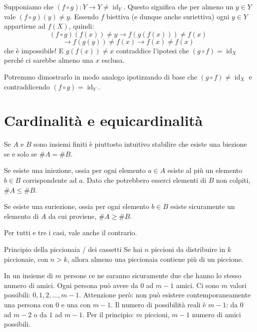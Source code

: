 \documentclass[12pt]{report}
\begin{document}
	\begin{dimostrazione}{}{}
		Supponiamo che $(f \circ g): Y \to Y \neq \operatorname{id}_Y$. Questo significa che per almeno un $y \in Y$ vale $(f \circ g)(y) \neq y$.
		Essendo $f$ biettiva (e dunque anche suriettiva) ogni $y \in Y$ appartiene ad $f(X)$, quindi:
		\[
		(f \circ g)(f(x)) \neq y \longrightarrow f(g(f(x))) \neq f(x)
		\]
		\[
		\longrightarrow f(g(y)) \neq f(x) \longrightarrow f(x) \neq f(x)
		\]
		che è impossibile! E $g(f(x)) \neq x$ contraddice l'ipotesi che $(g \circ f) = \operatorname{id}_X$ perché ci sarebbe almeno una $x$ esclusa.
		
		Potremmo dimostrarlo in modo analogo ipotizzando di base che $(g \circ f) \neq \operatorname{id}_X$ e contraddicendo $(f \circ g) = \operatorname{id}_Y$.
	\end{dimostrazione}
	
	\section{Cardinalità e equicardinalità}
	
	Se $A$ e $B$ sono insiemi finiti è piuttosto intuitivo stabilire che esiste una biezione se e solo se $\#A = \#B$.
	
	\begin{osservazione}{}{}
		Se esiste una iniezione, ossia per ogni elemento $a \in A$ esiste al più un elemento $b \in B$ corrispondente ad $a$. Dato che potrebbero esserci elementi di $B$ non colpiti, $\#A \leq \#B$.
	\end{osservazione}
	
	\begin{osservazione}{}{}
		Se esiste una suriezione, ossia per ogni elemento $b \in B$ esiste sicuramente un elemento di $A$ da cui proviene, $\#A \geq \#B$.
	\end{osservazione}
	
	Per tutti e tre i casi, vale anche il contrario.
	
	\begin{teorema}{Principio della piccionaia / dei cassetti}{}
		Se hai $n$ piccioni da distribuire in $k$ piccionaie, con $n > k$, allora almeno una piccionaia contiene più di un piccione.
	\end{teorema}
	
	\begin{osservazione}{}{}
		In un insieme di $m$ persone ce ne saranno sicuramente due che hanno lo stesso numero di amici. Ogni persona può avere da $0$ ad $m-1$ amici. Ci sono $m$ valori possibili: $0, 1, 2, \dots, m-1$.
		Attenzione però: non può esistere contemporaneamente una persona con $0$ e una con $m-1$. Il numero di possibilità reali è $m-1$: da $0$ ad $m-2$ o da $1$ ad $m-1$.
		Per il principio: $m$ piccioni, $m-1$ numero di amici possibili.
	\end{osservazione}
	
\end{document}
